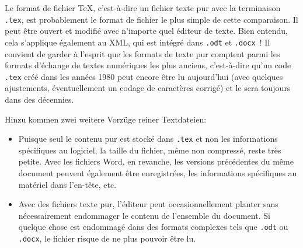 \documentclass[11pt,a4paper,ngerman,french,DIV=8]{scrartcl}
\begin{document}
Le format de fichier \TeX{}, c'est-à-dire un fichier texte pur avec la terminaison \texttt{.tex}, est probablement le format de fichier le plus simple de cette comparaison. Il peut être ouvert et modifié avec n'importe quel éditeur de texte. Bien entendu, cela s'applique également au XML, qui est intégré dans \texttt{.odt} et \texttt{.docx} ! Il convient de garder à l'esprit que les formats de texte pur comptent parmi les formats d'échange de textes numériques les plus anciens, c'est-à-dire qu'un code \texttt{.tex} créé dans les années 1980 peut encore être lu aujourd’hui (avec quelques ajustements, éventuellement un codage de caractères corrigé) et le sera toujours dans des décennies.

Hinzu kommen zwei weitere Vorzüge reiner Textdateien:
\begin{itemize}
  \item Puisque seul le contenu pur est stocké dans \texttt{.tex} et non les informations spécifiques au logiciel, la taille du fichier, même non compressé, reste très petite. Avec les fichiers Word, en revanche, les versions précédentes du même document peuvent également être enregistrées, les informations spécifiques au matériel dans l'en-tête, etc.
  \item Avec des fichiers texte pur, l'éditeur peut occasionnellement planter sans nécessairement endommager le contenu de l'ensemble du document. Si quelque chose est endommagé dans des formats complexes tels que \texttt{.odt} ou \texttt{.docx}, le fichier risque de ne plus pouvoir être lu.
\end{itemize}
\end{document}
